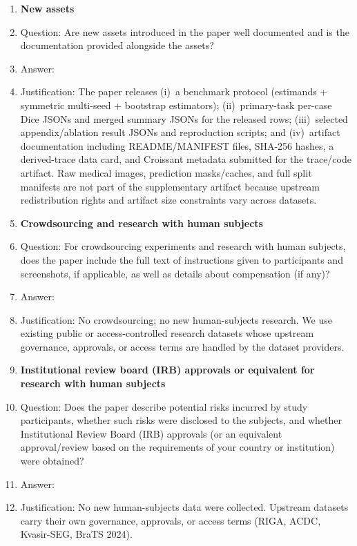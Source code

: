\begin{enumerate}[leftmargin=*,itemsep=2pt,parsep=0pt,topsep=2pt]
\item {\bf New assets}
    \item[] Question: Are new assets introduced in the paper well documented and is the documentation provided alongside the assets?
    \item[] Answer: \answerYes{}
\item[] Justification: The paper releases (i)~a benchmark protocol (estimands + symmetric multi-seed + bootstrap estimators); (ii)~primary-task per-case Dice JSONs and merged summary JSONs for the released rows; (iii)~selected appendix/ablation result JSONs and reproduction scripts; and (iv)~artifact documentation including README/MANIFEST files, SHA-256 hashes, a derived-trace data card, and Croissant metadata submitted for the trace/code artifact. Raw medical images, prediction masks/caches, and full split manifests are not part of the supplementary artifact because upstream redistribution rights and artifact size constraints vary across datasets.

\item {\bf Crowdsourcing and research with human subjects}
    \item[] Question: For crowdsourcing experiments and research with human subjects, does the paper include the full text of instructions given to participants and screenshots, if applicable, as well as details about compensation (if any)?
    \item[] Answer: \answerNA{}
    \item[] Justification: No crowdsourcing; no new human-subjects research. We use existing public or access-controlled research datasets whose upstream governance, approvals, or access terms are handled by the dataset providers.

\item {\bf Institutional review board (IRB) approvals or equivalent for research with human subjects}
    \item[] Question: Does the paper describe potential risks incurred by study participants, whether such risks were disclosed to the subjects, and whether Institutional Review Board (IRB) approvals (or an equivalent approval/review based on the requirements of your country or institution) were obtained?
    \item[] Answer: \answerNA{}
    \item[] Justification: No new human-subjects data were collected. Upstream datasets carry their own governance, approvals, or access terms (RIGA, ACDC, Kvasir-SEG, BraTS 2024).


\end{enumerate}
